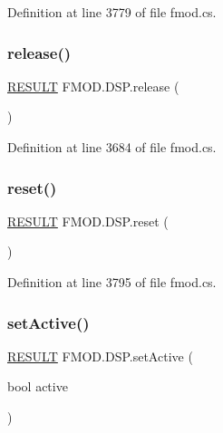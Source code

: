 Definition at line 3779 of file fmod.\+cs.

\mbox{\label{class_f_m_o_d_1_1_d_s_p_ae40c39c8ab23fe06bdecb96edd8bbe32}} 
\subsubsection{\texorpdfstring{release()}{release()}}
{\footnotesize\ttfamily \hyperlink{namespace_f_m_o_d_a305d1176ef3f8c8815861a60407ac33d}{R\+E\+S\+U\+LT} F\+M\+O\+D.\+D\+S\+P.\+release (\begin{DoxyParamCaption}{ }\end{DoxyParamCaption})}



Definition at line 3684 of file fmod.\+cs.

\mbox{\label{class_f_m_o_d_1_1_d_s_p_a9d60931bf4c560ff79a28e48ff7da66d}} 
\subsubsection{\texorpdfstring{reset()}{reset()}}
{\footnotesize\ttfamily \hyperlink{namespace_f_m_o_d_a305d1176ef3f8c8815861a60407ac33d}{R\+E\+S\+U\+LT} F\+M\+O\+D.\+D\+S\+P.\+reset (\begin{DoxyParamCaption}{ }\end{DoxyParamCaption})}



Definition at line 3795 of file fmod.\+cs.

\mbox{\label{class_f_m_o_d_1_1_d_s_p_a4550289d35ae8cbc8705b6336b8f9442}} 
\subsubsection{\texorpdfstring{set\+Active()}{setActive()}}
{\footnotesize\ttfamily \hyperlink{namespace_f_m_o_d_a305d1176ef3f8c8815861a60407ac33d}{R\+E\+S\+U\+LT} F\+M\+O\+D.\+D\+S\+P.\+set\+Active (\begin{DoxyParamCaption}\item[{bool}]{active }\end{DoxyParamCaption})}



